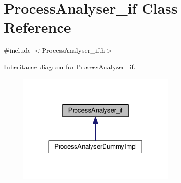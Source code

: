 \hypertarget{class_process_analyser__if}{}\section{Process\+Analyser\+\_\+if Class Reference}
\label{class_process_analyser__if}


{\ttfamily \#include $<$Process\+Analyser\+\_\+if.\+h$>$}



Inheritance diagram for Process\+Analyser\+\_\+if\+:\nopagebreak
\begin{figure}[H]
\begin{center}
\leavevmode
\includegraphics[width=224pt]{class_process_analyser__if__inherit__graph}
\end{center}
\end{figure}
